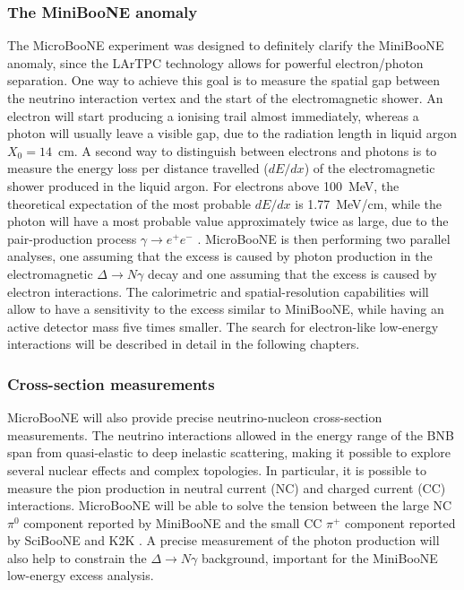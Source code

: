 \subsubsection{The MiniBooNE anomaly}
The MicroBooNE experiment was designed to definitely clarify the MiniBooNE anomaly, since the LArTPC technology allows for powerful electron/photon separation. One way to achieve this goal is to measure the spatial gap between the neutrino interaction vertex and the start of the electromagnetic shower. An electron will start producing a ionising trail almost immediately, whereas a photon will usually leave a visible gap, due to the radiation length in liquid argon $X_0 = 14$~cm.
A second way to distinguish between electrons and photons is to measure the energy loss per distance travelled ($dE/dx$) of the electromagnetic shower produced in the liquid argon. For electrons above 100~MeV, the theoretical expectation of the most probable $dE/dx$ is 1.77~MeV/cm, while the photon will have a most probable value approximately twice as large, due to the pair-production process $\gamma\rightarrow e^+e^-$ \cite{Acciarri:2016sli}. 
MicroBooNE is then performing two parallel analyses, one assuming that the excess is caused by photon production in the electromagnetic $\Delta\rightarrow N\gamma$ decay and one assuming that the excess is caused by electron interactions. The calorimetric and spatial-resolution capabilities will allow to have a sensitivity to the excess similar to MiniBooNE, while having an active detector mass five times smaller.  The search for electron-like low-energy interactions will be described in detail in the following chapters.

\subsubsection{Cross-section measurements}
MicroBooNE will also provide precise neutrino-nucleon cross-section measurements. The neutrino interactions allowed in the energy range of the BNB span from quasi-elastic to deep inelastic scattering, making it possible to explore several nuclear effects and complex topologies.
In particular, it is possible to measure the pion production in neutral current (NC) and charged current (CC) interactions. MicroBooNE will be able to solve the tension between the large NC $\pi^0$ component reported by MiniBooNE and the small CC $\pi^+$ component reported by SciBooNE \cite{Hiraide:2008eu} and K2K \cite{Tanaka:2006zm}. A precise measurement of the photon production will also help to constrain the $\Delta\rightarrow N\gamma$ background, important for the MiniBooNE low-energy excess analysis. 

